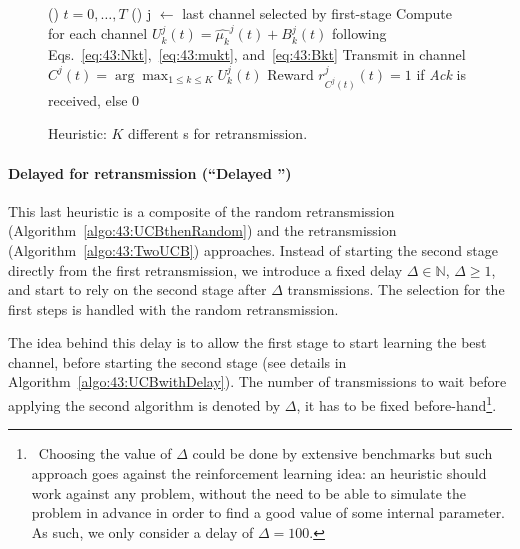 \vspace*{-3pt}
	\begin{figure}[h!]
		\centering
		\begin{algorithm}[H]
			\For()
			{$t = 0, \dots, T$}{
				\Else(){ %
					j $\leftarrow$ last channel selected by first-stage \UCB\;
					Compute for each channel $U_k^j(t) = \widehat{\mu_k}^j(t) + B_k^j(t)$ following Eqs.~\eqref{eq:43:Nkt},~\eqref{eq:43:mukt}, and~\eqref{eq:43:Bkt}\;
					Transmit in channel $C^j(t) = \arg\max_{1\leq k \leq K} U^j_k(t)$\;
					Reward $r^j_{C^j(t)}(t) = 1$ if \emph{Ack} is received, else $0$\;
				}
			}
			\caption{Heuristic: $K$ different {\UCB}s for retransmission.}
			\label{algo:43:UCBthenKp1}
		\end{algorithm}
	\end{figure}

\paragraph{Delayed \UCB{} for retransmission (``Delayed \UCB{}'')}\label{sub:43:UCBwithDelay}

This last heuristic is a composite of
the random retransmission (Algorithm~\ref{algo:43:UCBthenRandom})
and the \UCB{} retransmission (Algorithm~\ref{algo:43:TwoUCB}) approaches.
Instead of starting the second stage \UCB{} directly from the first retransmission, we introduce a fixed delay $\Delta\in\mathbb{N}$, $\Delta \geq 1$,
and start to rely on the second stage \UCB{} after $\Delta$ transmissions.
The selection for the first steps is handled with the random retransmission.

The idea behind this delay is to allow the first stage \UCB{} to start learning the best channel, before starting the second stage \UCB{} (see details in Algorithm~\ref{algo:43:UCBwithDelay}).
The number of transmissions to wait before applying the second algorithm is denoted by $\Delta$, it has to be fixed before-hand\footnote{~Choosing the value of $\Delta$ could be done by extensive benchmarks but such approach goes against the reinforcement learning idea: an heuristic should work against any problem, without the need to be able to simulate the problem in advance in order to find a good value of some internal parameter. As such, we only consider a delay of $\Delta=100$.}.

